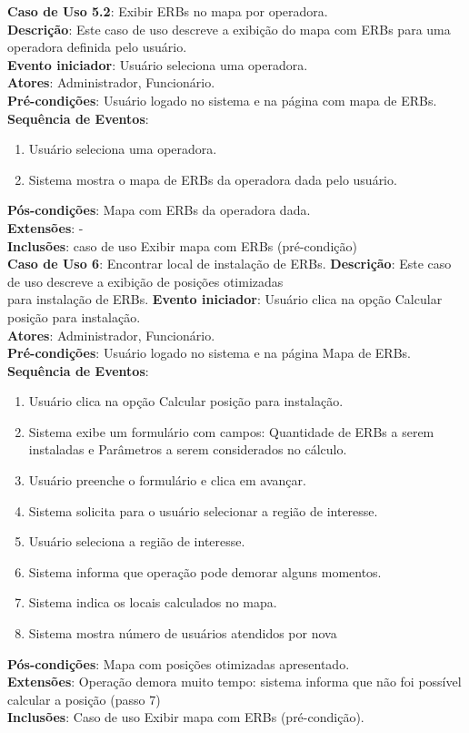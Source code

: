\documentclass[]{politex}
\begin{document}
\noindent \textbf{Caso de Uso 5.2}: Exibir ERBs no mapa por operadora. \\
\textbf{Descrição}: Este caso de uso descreve a exibição do mapa com ERBs para
uma operadora definida pelo usuário. \\
\textbf{Evento iniciador}: Usuário seleciona uma operadora. \\
\textbf{Atores}: Administrador, Funcionário. \\
\textbf{Pré-condições}: Usuário logado no sistema e na página com mapa de ERBs. \\
\textbf{Sequência de Eventos}:
\begin{enumerate}
\item Usuário seleciona uma operadora.
\item Sistema mostra o mapa de ERBs da operadora dada pelo usuário.
\end{enumerate}
\textbf{Pós-condições}: Mapa com ERBs da operadora dada. \\
\textbf{Extensões}: - \\
\textbf{Inclusões}: caso de uso Exibir mapa com ERBs (pré-condição) \\

\noindent \textbf{Caso de Uso 6}: Encontrar local de instalação de ERBs.
\textbf{Descrição}: Este caso de uso descreve a exibição de posições otimizadas \\
para instalação de ERBs. 
\textbf{Evento iniciador}: Usuário clica na opção Calcular posição para instalação. \\
\textbf{Atores}: Administrador, Funcionário. \\
\textbf{Pré-condições}: Usuário logado no sistema e na página Mapa de ERBs. \\
\textbf{Sequência de Eventos}:
\begin{enumerate}
\item Usuário clica na opção Calcular posição para instalação.
\item Sistema exibe um formulário com campos: Quantidade de ERBs a serem
instaladas e Parâmetros a serem considerados no cálculo.
\item Usuário preenche o formulário e clica em avançar.
\item Sistema solicita para o usuário selecionar a região de interesse.
\item Usuário seleciona a região de interesse.
\item Sistema informa que operação pode demorar alguns momentos.
\item Sistema indica os locais calculados no mapa.
\item Sistema mostra número de usuários atendidos por nova 
\end{enumerate}
\textbf{Pós-condições}: Mapa com posições otimizadas apresentado. \\
\textbf{Extensões}: Operação demora muito tempo: sistema informa que não foi
possível calcular a posição (passo 7) \\
\textbf{Inclusões}: Caso de uso Exibir mapa com ERBs (pré-condição). \\
\end{document}
